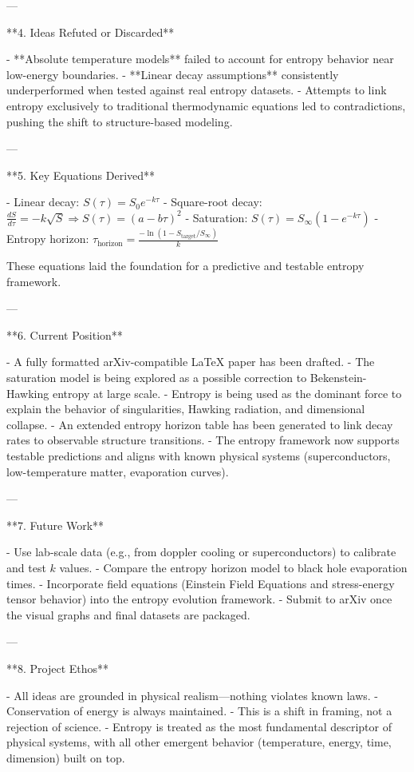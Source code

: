 ---

**4. Ideas Refuted or Discarded**

- **Absolute temperature models** failed to account for entropy behavior near low-energy boundaries.
- **Linear decay assumptions** consistently underperformed when tested against real entropy datasets.
- Attempts to link entropy exclusively to traditional thermodynamic equations led to contradictions, pushing the shift to structure-based modeling.

---

**5. Key Equations Derived**

- Linear decay: \( S(\tau) = S_0 e^{-k\tau} \)
- Square-root decay: \( \frac{dS}{d\tau} = -k \sqrt{S} \Rightarrow S(\tau) = (a - b\tau)^2 \)
- Saturation: \( S(\tau) = S_\infty (1 - e^{-k\tau}) \)
- Entropy horizon: \( \tau_{\text{horizon}} = \frac{-\ln(1 - S_{\text{target}} / S_\infty)}{k} \)

These equations laid the foundation for a predictive and testable entropy framework.

---

**6. Current Position**

- A fully formatted arXiv-compatible LaTeX paper has been drafted.
- The saturation model is being explored as a possible correction to Bekenstein-Hawking entropy at large scale.
- Entropy is being used as the dominant force to explain the behavior of singularities, Hawking radiation, and dimensional collapse.
- An extended entropy horizon table has been generated to link decay rates to observable structure transitions.
- The entropy framework now supports testable predictions and aligns with known physical systems (superconductors, low-temperature matter, evaporation curves).

---

**7. Future Work**

- Use lab-scale data (e.g., from doppler cooling or superconductors) to calibrate and test \( k \) values.
- Compare the entropy horizon model to black hole evaporation times.
- Incorporate field equations (Einstein Field Equations and stress-energy tensor behavior) into the entropy evolution framework.
- Submit to arXiv once the visual graphs and final datasets are packaged.

---

**8. Project Ethos**

- All ideas are grounded in physical realism—nothing violates known laws.
- Conservation of energy is always maintained.
- This is a shift in framing, not a rejection of science.
- Entropy is treated as the most fundamental descriptor of physical systems, with all other emergent behavior (temperature, energy, time, dimension) built on top.

